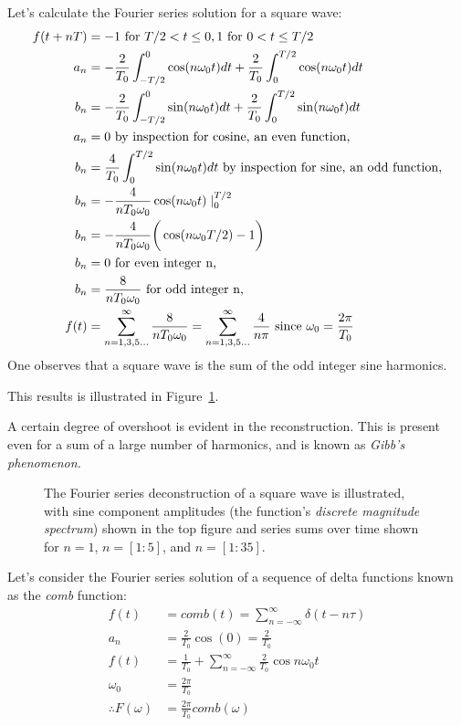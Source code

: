 \documentclass[11pt]{report}
\begin{document}
Let's calculate the Fourier series solution for a square wave:
\begin{equation*}
\begin{split}
f(t+nT) & =  -1 \text{ for } T/2 < t \le 0, 1 \text{ for }0<t\le T/2\\
a_{n}&=-\frac{2}{T_{0}}\int^{0}_{-T/2}\cos(n\omega_{0}t)dt+\frac{2}{T_{0}}\int^{T/2}_{0}\cos(n\omega_{0}t)dt\\
b_{n}&=-\frac{2}{T_{0}}\int^{0}_{-T/2}\sin(n\omega_{0}t)dt+\frac{2}{T_{0}}\int^{T/2}_{0}\sin(n\omega_{0}t)dt\\
a_{n}&= 0 \text{ by inspection for cosine, an even function,}\\
b_{n}&=\frac{4}{T_{0}}\int^{T/2}_{0}\sin(n\omega_{0}t)dt\text{ by inspection for sine, an odd function,}\\
b_{n}&=-\frac{4}{nT_{0}\omega_{0}}\cos(n\omega_{0}t)\mid^{T/2}_{0}\\
b_{n}&=-\frac{4}{nT_{0}\omega_{0}}\bigg{(}\cos(n\omega_{0}T/2)-1\bigg{)}\\
b_{n}&= 0 \text{ for even integer n,}\\
b_{n}&= \frac{8}{nT_{0}\omega_{0}} \text{ for odd integer n,}\\
f(t)&=\sum^{\infty}_{n=1,3,5...}\frac{8}{nT_{0}\omega_{0}}=\sum^{\infty}_{n=1,3,5...}\frac{4}{n\pi}\text{
since }\omega_{0}=\frac{2\pi}{T_{0}}\\
\end{split}
\end{equation*}
One observes that a square wave is the sum of the odd integer sine harmonics.

This results is illustrated in Figure~\ref{fig:square_fs}.

A certain degree of overshoot is evident in the reconstruction.  This
is present even for a sum of a large number of harmonics, and is known as \textit{Gibb's phenomenon.}

\begin{figure}[ht]
\centering
\epsfxsize=6.0in
\caption{The Fourier series deconstruction of a square wave is illustrated, with
sine component amplitudes (the function's \textit{discrete magnitude
spectrum}) shown in the top figure and series sums over
time shown for $n = 1$, $n = [1:5]$, and $n=[1:35]$.}  
\label{fig:square_fs}
\end{figure}

Let's consider the Fourier series solution of a sequence of delta
functions known as the \textit{comb} function:
\begin{equation*}
\begin{split}
f(t) & = comb(t) = \sum^{\infty}_{n=-\infty}\delta(t-n\tau)\\
a_{n}&=\frac{2}{T_{0}}\cos(0)=\frac{2}{T_{0}}\\
f(t)&=\frac{1}{T_{0}}+\sum^{\infty}_{n=-\infty}\frac{2}{T_{0}}\cos
n\omega_{0}t\\
\omega_{0}&=\frac{2\pi}{T_{0}}\\
\therefore F(\omega)& = \frac{2\pi}{T_{0}}comb(\omega)
\end{split}
\end{equation*}
\end{document}
